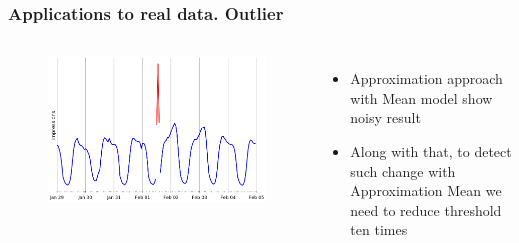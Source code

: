 \documentclass[intlimits, 9pt, unicode]{beamer}
\begin{document}
\begin{frame}
    \frametitle{Applications to real data. Outlier}
  \begin{columns}[T,onlytextwidth]
	\begin{figure}
	\includegraphics[scale=0.2]{images/methods_comparison_4}
	\end{figure}
	    \begin{itemize}
	    	\item Approximation approach with Mean model show noisy result
		\item Along with that, to detect such change with Approximation Mean we need to reduce threshold ten times
	    \end{itemize}
     \end{columns}
      
\end{frame}
\end{document}
